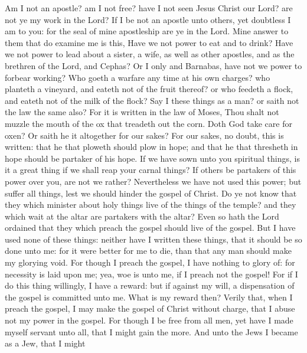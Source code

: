  Am I not an apostle? am I not free? have I not seen Jesus
Christ our Lord? are not ye my work in the Lord?  If I be
not an apostle unto others, yet doubtless I am to you: for the seal of
mine apostleship are ye in the Lord.  Mine answer to them
that do examine me is this,  Have we not power to eat and
to drink?  Have we not power to lead about a sister, a
wife, as well as other apostles, and as the brethren of the Lord, and
Cephas?  Or I only and Barnabas, have not we power to
forbear working?  Who goeth a warfare any time at his own
charges? who planteth a vineyard, and eateth not of the fruit thereof?
or who feedeth a flock, and eateth not of the milk of the flock?
 Say I these things as a man? or saith not the law the
same also?  For it is written in the law of Moses, Thou
shalt not muzzle the mouth of the ox that treadeth out the corn. Doth
God take care for oxen?  Or saith he it altogether for
our sakes? For our sakes, no doubt, this is written: that he that
ploweth should plow in hope; and that he that thresheth in hope should
be partaker of his hope.  If we have sown unto you
spiritual things, is it a great thing if we shall reap your carnal
things?  If others be partakers of this power over you,
are not we rather? Nevertheless we have not used this power; but suffer
all things, lest we should hinder the gospel of Christ. 
Do ye not know that they which minister about holy things live of the
things of the temple? and they which wait at the altar are partakers
with the altar?  Even so hath the Lord ordained that they
which preach the gospel should live of the gospel.  But I
have used none of these things: neither have I written these things,
that it should be so done unto me: for it were better for me to die,
than that any man should make my glorying void.  For
though I preach the gospel, I have nothing to glory of: for necessity is
laid upon me; yea, woe is unto me, if I preach not the gospel!
 For if I do this thing willingly, I have a reward: but
if against my will, a dispensation of the gospel is committed unto me.
 What is my reward then? Verily that, when I preach the
gospel, I may make the gospel of Christ without charge, that I abuse not
my power in the gospel.  For though I be free from all
men, yet have I made myself servant unto all, that I might gain the
more.  And unto the Jews I became as a Jew, that I might
